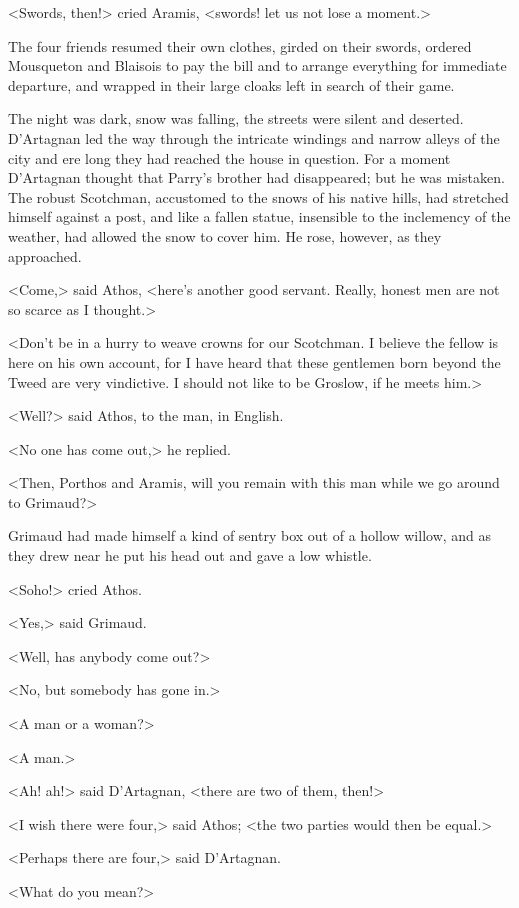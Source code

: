 <Swords, then!> cried Aramis, <swords! let us not lose a moment.>

The four friends resumed their own clothes, girded on their swords, ordered Mousqueton and Blaisois to pay the bill and to arrange everything for immediate departure, and wrapped in their large cloaks left in search of their game.

The night was dark, snow was falling, the streets were silent and deserted. D'Artagnan led the way through the intricate windings and narrow alleys of the city and ere long they had reached the house in question. For a moment D'Artagnan thought that Parry's brother had disappeared; but he was mistaken. The robust Scotchman, accustomed to the snows of his native hills, had stretched himself against a post, and like a fallen statue, insensible to the inclemency of the weather, had allowed the snow to cover him. He rose, however, as they approached.

<Come,> said Athos, <here's another good servant. Really, honest men are not so scarce as I thought.>

<Don't be in a hurry to weave crowns for our Scotchman. I believe the fellow is here on his own account, for I have heard that these gentlemen born beyond the Tweed are very vindictive. I should not like to be Groslow, if he meets him.>

<Well?> said Athos, to the man, in English.

<No one has come out,> he replied.

<Then, Porthos and Aramis, will you remain with this man while we go around to Grimaud?>

Grimaud had made himself a kind of sentry box out of a hollow willow, and as they drew near he put his head out and gave a low whistle.

<Soho!> cried Athos.

<Yes,> said Grimaud.

<Well, has anybody come out?>

<No, but somebody has gone in.>

<A man or a woman?>

<A man.>

<Ah! ah!> said D'Artagnan, <there are two of them, then!>

<I wish there were four,> said Athos; <the two parties would then be equal.>

<Perhaps there are four,> said D'Artagnan.

<What do you mean?>

